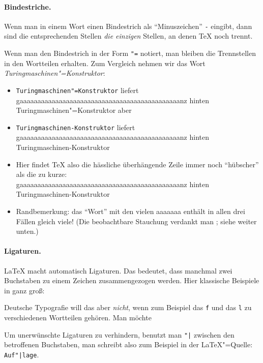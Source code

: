 \paragraph{Bindestriche.}

Wenn man in einem Wort einen Bindestrich als "`Minuszeichen"' \verb|-|
eingibt, dann sind die entsprechenden Stellen \emph{die einzigen} Stellen, an
denen \TeX{} noch trennt.

Wenn man den Bindestrich in der Form \verb|"=| notiert, man bleiben die
Trennstellen in den Wortteilen erhalten. Zum Vergleich nehmen wir das Wort
\emph{Turingmaschinen"=Konstruktor}:
\begin{itemize}
\item \verb|Turingmaschinen"=Konstruktor| liefert\\
  gaaaaaaaaaaaaaaaaaaaaaaaaaaaaaaaaaaaaaaaaaaaaanz hinten Turingmaschinen"=Konstruktor
  aber
\item  \verb|Turingmaschinen-Konstruktor| liefert\\
  gaaaaaaaaaaaaaaaaaaaaaaaaaaaaaaaaaaaaaaaaaaaaanz hinten Turingmaschinen-Konstruktor
\item Hier findet \TeX{} also die hässliche überhängende Zeile immer
  noch "`hübscher"'
  als die zu kurze:\\
  gaaaaaaaaaaaaaaaaaaaaaaaaaaaaaaaaaaaaaaaaaaaaanz hinten \\
  Turingmaschinen-Konstruktor
\item Randbemerkung: das "`Wort"' mit den vielen aaaaaaa enthält in allen drei
  Fällen gleich viele! (Die beobachtbare Stauchung verdankt man
  ; siehe weiter unten.)
\end{itemize}

\paragraph{Ligaturen.}

\LaTeX{} macht automatisch Ligaturen. Das bedeutet, dass manchmal zwei
Buchstaben zu einem Zeichen zusammengezogen werden. Hier klassische Beispiele
in ganz groß:
%
\begin{center}
  \scalebox{3}{fl ff ffl}
\end{center}
%
Deutsche Typografie will das aber \emph{nicht}, wenn zum Beispiel das \verb|f|
und das \verb|l| zu verschiedenen Wortteilen gehören.  Man möchte 
%
\begin{center}
\end{center}
%
Um unerwünschte Ligaturen zu verhindern, benutzt man \verb="|= zwischen den
betroffenen Buchstaben, man schreibt also zum Beispiel in der \LaTeX"=Quelle:
\verb=Auf"|lage=.

